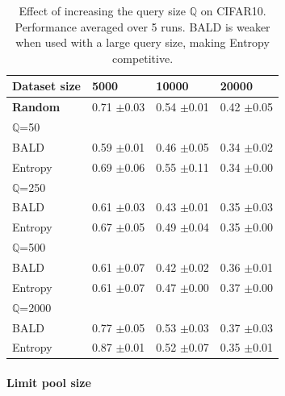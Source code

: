 \documentclass{article}
\newcommand{\std}[1]{ \normalfont \color{darkgray}\footnotesize{$\pm$#1} }
\newcommand{\Q}{{\mathbb Q}}
\begin{document}
\begin{table}
{\small
\begin{tabular}{llll}
\toprule
    Dataset size &          5000 &         10000 &         20000 \\
\midrule
\textbf{Random} &  0.71 \std{0.03} &  0.54 \std{0.01} &  0.42 \std{0.05} \\
\hline
   $\Q$=50 &                  &                  &                  \\
   \hline
            BALD &  0.59 \std{0.01} &  0.46 \std{0.05} &  0.34 \std{0.02} \\
         Entropy &  0.69 \std{0.06} &  0.55 \std{0.11} &  0.34 \std{0.00} \\
          \hline
  $\Q$=250 &                  &                  &                  \\
  \hline
            BALD &  0.61 \std{0.03} &  0.43 \std{0.01} &  0.35 \std{0.03} \\
         Entropy &  0.67 \std{0.05} &  0.49 \std{0.04} &  0.35 \std{0.00} \\
          \hline
  $\Q$=500 &                  &                  &                  \\
  \hline
            BALD &  0.61 \std{0.07} &  0.42 \std{0.02} &  0.36 \std{0.01} \\
         Entropy &  0.61 \std{0.07} &  0.47 \std{0.00} &  0.37 \std{0.00} \\
          \hline
 $\Q$=2000 &                  &                  &                  \\
 \hline
            BALD &  0.77 \std{0.05} &  0.53 \std{0.03} &  0.37 \std{0.03} \\
         Entropy &  0.87 \std{0.01} &  0.52 \std{0.07} &  0.35 \std{0.01} \\
\bottomrule
\end{tabular}}



    \centering
    \caption{Effect of increasing the query size $\Q$ on CIFAR10. Performance averaged over 5 runs. BALD is weaker when used with a large query size, making Entropy competitive.}
    \label{fig:query_size}
\end{table}

\paragraph{Limit pool size}
\end{document}
